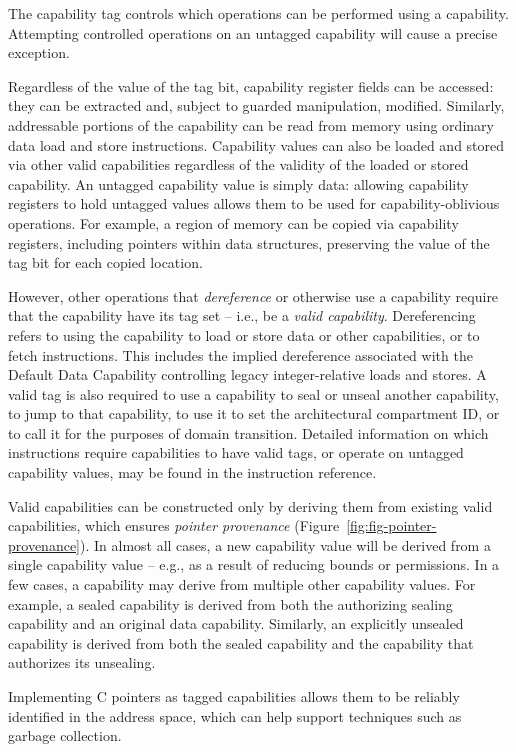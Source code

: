 The capability tag controls which operations can be performed using a
capability.
Attempting controlled operations on an untagged capability will cause a
precise exception.

Regardless of the value of the tag bit, capability register fields can be
accessed: they can be extracted and, subject to guarded manipulation,
modified.
Similarly, addressable portions of the capability can be read from memory
using ordinary data load and store instructions.
Capability values can also be loaded and stored via other valid capabilities
regardless of the validity of the loaded or stored capability.
An untagged capability value is simply data: allowing capability registers to
hold untagged values allows them to be used for capability-oblivious
operations.
For example, a region of memory can be copied via capability registers, including pointers within data structures, preserving the value of the
tag bit for each copied location.

However, other operations that \textit{dereference} or otherwise use a
capability require that the capability have its tag set -- i.e., be a
\textit{valid capability}.
Dereferencing refers to using the capability to load or store data or other
capabilities, or to fetch instructions.
This includes the implied dereference associated with the Default Data
Capability controlling legacy integer-relative loads and stores.
A valid tag is also required to use a capability to seal or unseal another
capability, to jump to that capability, to use it to set the architectural
compartment ID, or to call it for the purposes of domain transition.
Detailed information on which instructions require capabilities to have valid
tags, or operate on untagged capability values, may be found in the
instruction reference.

Valid capabilities can be constructed only by deriving them from existing
valid capabilities, which ensures \textit{pointer provenance}
(Figure~\ref{fig:fig-pointer-provenance}).
In almost all cases, a new capability value will be derived from a single
capability value -- e.g., as a result of reducing bounds or permissions.
In a few cases, a capability may derive from multiple other capability
values.
For example, a sealed capability is derived from both the authorizing sealing
capability and an original data capability.
Similarly, an explicitly unsealed capability is derived from both the sealed
capability and the capability that authorizes its unsealing.

Implementing C pointers as tagged capabilities allows them to be reliably
identified in the address space, which can help support techniques
such as garbage collection.

